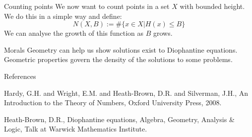 \documentclass{beamer}
\begin{document}
\begin{frame}{Counting points}
We now want to count points in a set $X$ with bounded height.
We do this in a simple way and define:
$$N(X,B) := \#\{x\in X | H(x) \leq B\}$$
We can analyse the growth of this function as $B$ grows.
\end{frame}


\begin{frame}{Morals}
Geometry can help us show solutions exist to Diophantine equations. \\
Geometric properties govern the density of the solutions to some problems. \\
\end{frame}


\begin{frame}{References}
\begin{thebibliography}{9}

  Hardy, G.H. and Wright, E.M. and Heath-Brown, D.R. and Silverman, J.H.,
  An Introduction to the Theory of Numbers,
  Oxford University Press,
  2008.

  Heath-Brown, D.R.,
  Diophantine equations, Algebra, Geometry, Analysis \& Logic,
  Talk at Warwick Mathematics Institute.

\end{thebibliography}
\end{frame}
\end{document}
